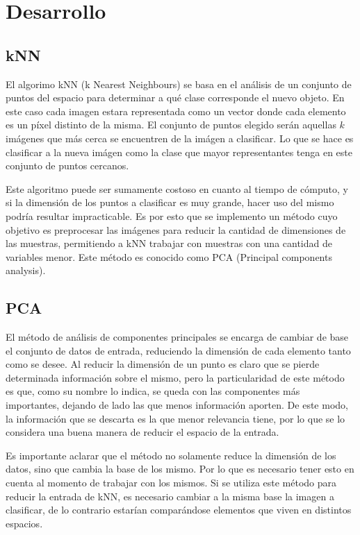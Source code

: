 \section{Desarrollo}

\subsection{kNN}

El algorimo kNN (k Nearest Neighbours) se basa en el análisis de un conjunto de puntos del espacio para determinar a qué clase corresponde el nuevo objeto. En este caso cada imagen estara representada como un vector donde cada elemento es un píxel distinto de la misma. El conjunto de puntos elegido serán aquellas $k$ imágenes que más cerca se encuentren de la imágen a clasificar. Lo que se hace es clasificar a la nueva imágen como la clase que mayor representantes tenga en este conjunto de puntos cercanos.

Este algoritmo puede ser sumamente costoso en cuanto al tiempo de cómputo, y si la dimensión de los puntos a clasificar es muy grande, hacer uso del mismo podría resultar impracticable. Es por esto que se implemento un método cuyo objetivo es preprocesar las imágenes para reducir la cantidad de dimensiones de las muestras, permitiendo a kNN trabajar con muestras con una cantidad de variables menor. Este método es conocido como PCA (Principal components analysis).

\subsection{PCA}

El método de análisis de componentes principales se encarga de cambiar de base el conjunto de datos de entrada, reduciendo la dimensión de cada elemento tanto como se desee. Al reducir la dimensión de un punto es claro que se pierde determinada información sobre el mismo, pero la particularidad de este método es que, como su nombre lo indica, se queda con las componentes más importantes, dejando de lado las que menos información aporten. De este modo, la información que se descarta es la que menor relevancia tiene, por lo que se lo considera una buena manera de reducir el espacio de la entrada.

Es importante aclarar que el método no solamente reduce la dimensión de los datos, sino que cambia la base de los mismo. Por lo que es necesario tener esto en cuenta al momento de trabajar con los mismos. Si se utiliza este método para reducir la entrada de kNN, es necesario cambiar a la misma base la imagen a clasificar, de lo contrario estarían comparándose elementos que viven en distintos espacios.

